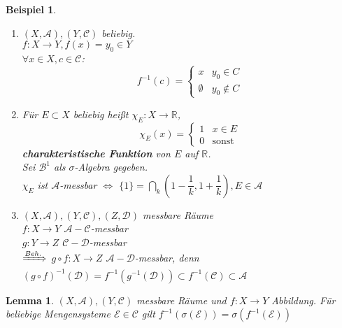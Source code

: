 \documentclass[11pt]{memoir}
\theoremstyle{changebreak}
\newtheorem{Beispiel}{Beispiel}[chapter]
\newtheorem{Lemma}{Lemma}[chapter]
\begin{document}
\begin{Beispiel}

\begin{enumerate}
	\item $(X, \mathscr{A}), (Y, \mathscr{C})$ beliebig. \\
	$f: X \rightarrow Y, f(x) = y_0 \in Y$ \\
	$\forall x \in X, c \in \mathscr{C}$:
	\begin{equation}
		f^{-1}(c) =
		\begin{cases}
			x & y_0 \in C \\
			\emptyset & y_0 \notin C
		\end{cases}
	\end{equation}
	\item Für $E \subset X$ beliebig heißt $\chi_E: X \rightarrow \mathbb{R}$, \\
	\begin{equation}
		\chi_E(x) =
		\begin{cases}
			1 & x \in E \\
			0 & \text{sonst}
		\end{cases}
	\end{equation}
	\textbf{charakteristische Funktion} von $E$ auf $\mathbb{R}$. \\
	Sei $\mathscr{B}^1$ als $\sigma$-Algebra gegeben. \\
	$\chi_E$ ist $\mathscr{A}$-messbar $\Leftrightarrow$ $\{1\} = \bigcap\limits_k \left(1- \dfrac{1}{k}, 1 + \dfrac{1}{k}\right), E \in \mathscr{A}$
	\item $(X, \mathscr{A}), (Y, \mathscr{C}), (Z, \mathscr{D})$ messbare Räume \\
	$f: X \rightarrow Y$ $ \mathscr{A}-\mathscr{C}$-messbar \\
	$g: Y \rightarrow Z$ $ \mathscr{C}-\mathscr{D}$-messbar \\
	$\xRightarrow{Beh.}$ $  g \circ f: X \rightarrow Z$ $ \mathscr{A}-\mathscr{D}$-messbar, denn \\
	$(g \circ f)^{-1}(\mathscr{D}) = f^{-1}(g^{-1}(\mathscr{D})) \subset f^{-1}(\mathscr{C}) \subset \mathscr{A}$
\end{enumerate}
\end{Beispiel}

\begin{Lemma}
$(X, \mathscr{A}), (Y, \mathscr{C})$ messbare Räume und $f: X \rightarrow Y$ Abbildung. Für beliebige Mengensysteme $\mathscr E \in \mathscr{C}$ gilt $f^{-1}(\sigma(\mathscr E)) = \sigma(f^{-1}(\mathscr E))$
\end{Lemma}
\end{document}
